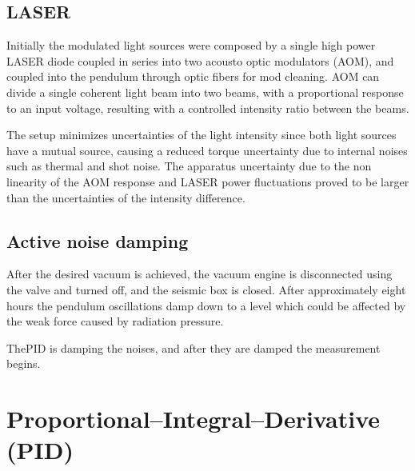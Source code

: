 \documentclass[\main/master.tex]{subfiles}
\begin{document}
\subsection{LASER}
Initially the modulated light sources were composed by a single high power LASER diode coupled in series into two acousto optic modulators (AOM), and coupled into the pendulum through optic fibers for mod cleaning. AOM can divide a single coherent light beam into two beams, with a proportional response to an input voltage, resulting with a controlled intensity ratio between the beams.
\par\noindent
The setup minimizes uncertainties of the light intensity since both light sources have a mutual source, causing a reduced torque uncertainty due to internal noises such as thermal and shot noise. The apparatus uncertainty due to the non linearity of the AOM response and LASER power fluctuations proved to be larger than the uncertainties of the intensity difference.   








\subsection{Active noise damping}
\par\noindent
After the desired vacuum is achieved, the vacuum engine is disconnected using the valve and turned off, and the seismic box is closed. After approximately eight hours the pendulum oscillations damp down to a level which could be affected by the weak force caused by radiation pressure.


\par\noindent
ThePID is damping the noises, and after they are damped the measurement begins.

















\section{Proportional–Integral–Derivative (PID)}
\end{document}
